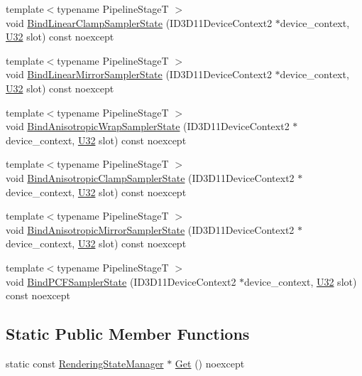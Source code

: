 \begin{DoxyCompactItemize}
\item 
{\footnotesize template$<$typename Pipeline\+StageT $>$ }\\void \hyperlink{classmage_1_1_rendering_state_manager_a3e4f35ec49cae88bb12b08f53048f0cc}{Bind\+Linear\+Clamp\+Sampler\+State} (I\+D3\+D11\+Device\+Context2 $\ast$device\+\_\+context, \hyperlink{namespacemage_a41c104c036fba3756a74e19f793eeaa1}{U32} slot) const noexcept
\item 
{\footnotesize template$<$typename Pipeline\+StageT $>$ }\\void \hyperlink{classmage_1_1_rendering_state_manager_a2039804048f0e0608629f1b9103a86a4}{Bind\+Linear\+Mirror\+Sampler\+State} (I\+D3\+D11\+Device\+Context2 $\ast$device\+\_\+context, \hyperlink{namespacemage_a41c104c036fba3756a74e19f793eeaa1}{U32} slot) const noexcept
\item 
{\footnotesize template$<$typename Pipeline\+StageT $>$ }\\void \hyperlink{classmage_1_1_rendering_state_manager_a4f19a882840d2cd30642ced801e05fa4}{Bind\+Anisotropic\+Wrap\+Sampler\+State} (I\+D3\+D11\+Device\+Context2 $\ast$device\+\_\+context, \hyperlink{namespacemage_a41c104c036fba3756a74e19f793eeaa1}{U32} slot) const noexcept
\item 
{\footnotesize template$<$typename Pipeline\+StageT $>$ }\\void \hyperlink{classmage_1_1_rendering_state_manager_a06d7cd55216985100c3a55deba7dfae2}{Bind\+Anisotropic\+Clamp\+Sampler\+State} (I\+D3\+D11\+Device\+Context2 $\ast$device\+\_\+context, \hyperlink{namespacemage_a41c104c036fba3756a74e19f793eeaa1}{U32} slot) const noexcept
\item 
{\footnotesize template$<$typename Pipeline\+StageT $>$ }\\void \hyperlink{classmage_1_1_rendering_state_manager_a99c79eea337b63fb749e6fa0f05a1365}{Bind\+Anisotropic\+Mirror\+Sampler\+State} (I\+D3\+D11\+Device\+Context2 $\ast$device\+\_\+context, \hyperlink{namespacemage_a41c104c036fba3756a74e19f793eeaa1}{U32} slot) const noexcept
\item 
{\footnotesize template$<$typename Pipeline\+StageT $>$ }\\void \hyperlink{classmage_1_1_rendering_state_manager_a2db1a0d4f5a6184d21886fdf02153d0b}{Bind\+P\+C\+F\+Sampler\+State} (I\+D3\+D11\+Device\+Context2 $\ast$device\+\_\+context, \hyperlink{namespacemage_a41c104c036fba3756a74e19f793eeaa1}{U32} slot) const noexcept
\end{DoxyCompactItemize}
\subsection*{Static Public Member Functions}
\begin{DoxyCompactItemize}
\item 
static const \hyperlink{classmage_1_1_rendering_state_manager}{Rendering\+State\+Manager} $\ast$ \hyperlink{classmage_1_1_rendering_state_manager_aeea3332b821a6519e81ae7de1cbafecb}{Get} () noexcept
\end{DoxyCompactItemize}
